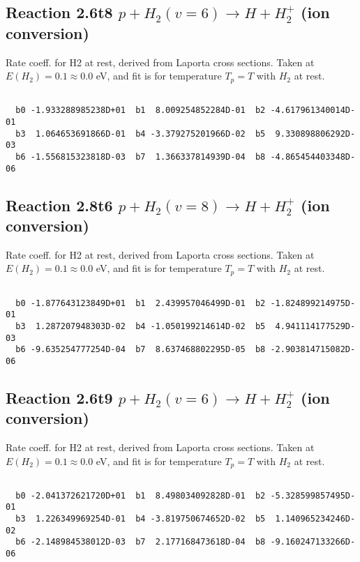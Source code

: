 \documentclass[12pt,dvipdfmx]{article}
\begin{document}
\newpage
\subsection{
Reaction 2.6t8
$ p + H_2(v=6) \rightarrow H + H_2^+$ (ion conversion)
}
Rate coeff. for H2 at rest, derived from Laporta cross sections.
Taken at $E(H_2) = 0.1 \approx 0.0$ eV,  and fit is for temperature $T_p=T$ with $H_2$ at rest.

\begin{small}\begin{verbatim}

  b0 -1.933288985238D+01  b1  8.009254852284D-01  b2 -4.617961340014D-01
  b3  1.064653691866D-01  b4 -3.379275201966D-02  b5  9.330898806292D-03
  b6 -1.556815323818D-03  b7  1.366337814939D-04  b8 -4.865454403348D-06

\end{verbatim}\end{small}

\newpage
\subsection{
Reaction 2.8t6
$ p + H_2(v=8) \rightarrow H + H_2^+$ (ion conversion)
}
Rate coeff. for H2 at rest, derived from Laporta cross sections.
Taken at $E(H_2) = 0.1 \approx 0.0$ eV,  and fit is for temperature $T_p=T$ with $H_2$ at rest.

\begin{small}\begin{verbatim}

  b0 -1.877643123849D+01  b1  2.439957046499D-01  b2 -1.824899214975D-01
  b3  1.287207948303D-02  b4 -1.050199214614D-02  b5  4.941114177529D-03
  b6 -9.635254777254D-04  b7  8.637468802295D-05  b8 -2.903814715082D-06

\end{verbatim}\end{small}

\newpage
\subsection{
Reaction 2.6t9
$ p + H_2(v=6) \rightarrow H + H_2^+$ (ion conversion)
}
Rate coeff. for H2 at rest, derived from Laporta cross sections.
Taken at $E(H_2) = 0.1 \approx 0.0$ eV,  and fit is for temperature $T_p=T$ with $H_2$ at rest.

\begin{small}\begin{verbatim}

  b0 -2.041372621720D+01  b1  8.498034092828D-01  b2 -5.328599857495D-01
  b3  1.226349969254D-01  b4 -3.819750674652D-02  b5  1.140965234246D-02
  b6 -2.148984538012D-03  b7  2.177168473618D-04  b8 -9.160247133266D-06

\end{verbatim}\end{small}
\end{document}
